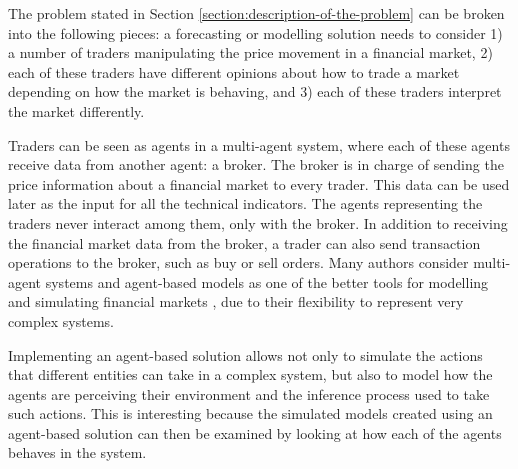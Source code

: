 The problem stated in Section \ref{section:description-of-the-problem} can be broken into the following pieces: a forecasting or modelling solution needs to consider 1) a number of traders manipulating the price movement in a financial market, 2) each of these traders have different opinions about how to trade a market depending on how the market is behaving, and 3) each of these traders interpret the market differently.

Traders can be seen as agents in a multi-agent system, where each of these agents receive data from another agent: a broker. The broker is in charge of sending the price information about a financial market to every trader. This data can be used later as the input for all the technical indicators. The agents representing the traders never interact among them, only with the broker. In addition to receiving the financial market data from the broker, a trader can also send transaction operations to the broker, such as buy or sell orders. Many authors consider multi-agent systems and agent-based models as one of the better tools for modelling and simulating financial markets \cite{Lebaron2001} \cite{Gamil2007} \cite{Boer-Sorban2008}, due to their flexibility to represent very complex systems.

Implementing an agent-based solution allows not only to simulate the actions that different entities can take in a complex system, but also to model how the agents are perceiving their environment and the inference process used to take such actions. This is interesting because the simulated models created using an agent-based solution can then be examined by looking at how each of the agents behaves in the system.



